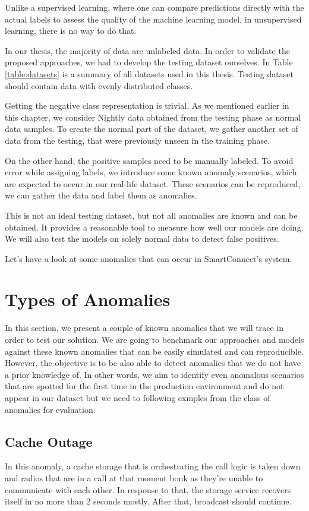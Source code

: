 Unlike a supervised learning, where one can compare predictions directly with the actual labels to assess the quality of the machine learning model, in unsupervised learning, there is no way to do that.

In our thesis, the majority of data are unlabeled data. In order to validate the proposed approaches, we had to develop the testing dataset ourselves. In Table \ref{table:datasets} is a summary of all datasets used in this thesis. Testing dataset should contain data with evenly distributed classes.

Getting the negative class representation is trivial. As we mentioned earlier in this chapter, we consider Nightly data obtained from the testing phase as normal data samples. To create the normal part of the dataset, we gather another set of data from the testing, that were previously unseen in the training phase. 

On the other hand, the positive samples need to be manually labeled. To avoid error while assigning labels, we introduce some known anomaly scenarios, which are expected to occur in our real-life dataset. These scenarios can be reproduced, we can gather the data and label them as anomalies. 

This is not an ideal testing dataset, but not all anomalies are known and can be obtained. It provides a reasonable tool to measure how well our models are doing. We will also test the models on solely normal data to detect false positives. 

Let's have a look at some anomalies that can occur in SmartConnect's system.


\section{Types of Anomalies}
\label{anomaly_types}
In this section, we present a couple of known anomalies that we will trace in order to test our solution.
We are going to benchmark our approaches and models against these known anomalies that can be easily simulated and can reproducible. 
However, the objective is to be also able to detect anomalies that we do not have a prior knowledge of.
In other words, we aim to identify even anomalous scenarios that are spotted for the first time in the production environment and do not appear in our dataset but we need to following exmples from the class of anomalies for evaluation.

\subsection{Cache Outage}
In this anomaly, a cache storage that is orchestrating the call logic is taken down and radios that are in a call at that moment bonk as they're unable to communicate with each other.
In response to that, the storage service recovers itself in no more than 2 seconds mostly. After that, broadcast should continue.

